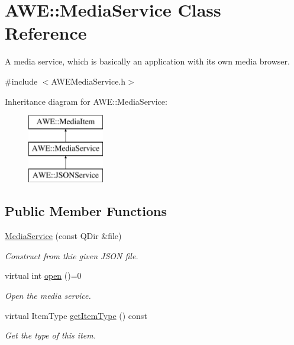 \hypertarget{class_a_w_e_1_1_media_service}{\section{A\-W\-E\-:\-:Media\-Service Class Reference}
\label{class_a_w_e_1_1_media_service}
}


A media service, which is basically an application with its own media browser.  




{\ttfamily \#include $<$A\-W\-E\-Media\-Service.\-h$>$}

Inheritance diagram for A\-W\-E\-:\-:Media\-Service\-:\begin{figure}[H]
\begin{center}
\leavevmode
\includegraphics[height=3.000000cm]{class_a_w_e_1_1_media_service}
\end{center}
\end{figure}
\subsection*{Public Member Functions}
\begin{DoxyCompactItemize}
\item 
\hyperlink{class_a_w_e_1_1_media_service_ac843939cc99358391e249e5fbaa4e318}{Media\-Service} (const Q\-Dir \&file)
\begin{DoxyCompactList}\small\item\em Construct from thie given J\-S\-O\-N file. \end{DoxyCompactList}\item 
virtual int \hyperlink{class_a_w_e_1_1_media_service_ad13c100468482ce42880941bbeca4623}{open} ()=0
\begin{DoxyCompactList}\small\item\em Open the media service. \end{DoxyCompactList}\item 
virtual Item\-Type \hyperlink{class_a_w_e_1_1_media_service_a680d2f9fd50b27cb7156c3a5777dee12}{get\-Item\-Type} () const 
\begin{DoxyCompactList}\small\item\em Get the type of this item. \end{DoxyCompactList}\end{DoxyCompactItemize}
